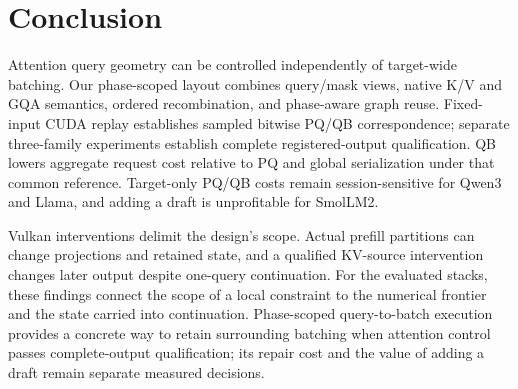 \section{Conclusion}
\label{sec:conclusion}
Attention query geometry can be controlled independently of target-wide batching. Our phase-scoped layout combines query/mask views, native K/V and GQA semantics, ordered recombination, and phase-aware graph reuse. Fixed-input CUDA replay establishes sampled bitwise PQ/QB correspondence; separate three-family experiments establish complete registered-output qualification. QB lowers aggregate request cost relative to PQ and global serialization under that common reference. Target-only PQ/QB costs remain session-sensitive for Qwen3 and Llama, and adding a draft is unprofitable for SmolLM2.

Vulkan interventions delimit the design's scope. Actual prefill partitions can change projections and retained state, and a qualified KV-source intervention changes later output despite one-query continuation. For the evaluated stacks, these findings connect the scope of a local constraint to the numerical frontier and the state carried into continuation. Phase-scoped query-to-batch execution provides a concrete way to retain surrounding batching when attention control passes complete-output qualification; its repair cost and the value of adding a draft remain separate measured decisions.
